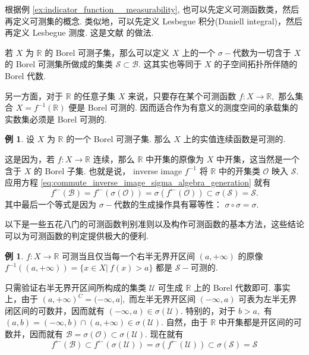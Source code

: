 \documentclass[12pt, a4paper, oneside]{book}
\numberwithin{figure}{section}
\theoremstyle{definition}
\newtheorem{example}[theorem]{例}
\begin{document}
根据例 \ref{ex:indicator_function__measurability}, 也可以先定义可测函数类，然后再定义可测集的概念. 类似地，可以先定义 Lesbegue 积分(Daniell integral)，然后再定义 Lesbegue 测度. 这是文献 \cite{Willem_2022} 的做法.

若 $X$ 为 $\mathbb R$ 的 Borel 可测子集，那么可以定义 $X$ 上的一个 $\sigma-$代数为一切含于 $X$ 的 Borel 可测集所做成的集类 $\mathcal S\subset \mathcal B.$ 这其实也等同于 $X$ 的子空间拓扑所伴随的 Borel 代数.

另一方面，对于 $\mathbb R$ 的任意子集 $X$ 来说，只要存在某个可测函数 $f:X\to\mathbb R,$ 那么集合 $X=f^{-1}(\mathbb R)$ 便是 Borel 可测的. 因而适合作为有意义的测度空间的承载集的实数集必须是 Borel 可测的.
\begin{example}
    设 $X$ 为 $\mathbb R$ 的一个 Borel 可测子集. 那么 $X$ 上的实值连续函数是可测的.
\end{example}
这是因为，若 $f:X\to\mathbb R$ 连续，那么 $\mathbb R$ 中开集的原像为 $X$ 中开集，这当然是一个含于 $X$ 的 Borel 子集.
也就是说， inverse image $f^{-1}$ 将 $\mathbb R$ 中的开集类 $\mathcal O$ 映入 $\mathcal S.$ 应用方程 \eqref{eq:commute_inverse_image_sigma_algebra_generation} 就有
\begin{equation}
    f^\leftarrow(\mathcal B)=f^\leftarrow(\sigma(\mathcal O))=\sigma(f^\leftarrow(\mathcal O))\subset \sigma(\mathcal S)=\mathcal S.
\end{equation}
其中最后一个等式是因为 $\sigma-$代数的生成操作具有幂等性： $\sigma\circ\sigma=\sigma.$

以下是一些五花八门的可测函数判别准则以及构作可测函数的基本方法，这些结论可以为可测函数的判定提供极大的便利.

\begin{example}\label{ex:function__measurability_semiinfinite_open_interval}
    $f:X\to\mathbb R$ 可测当且仅当每一个右半无界开区间 $(a,+\infty)$ 的原像 $f^{-1}((a,+\infty))=\{x\in X|\ f(x)>a\}$ 都是 $\mathcal S-$可测的. 
\end{example}
只需验证右半无界开区间所构成的集类 $\mathcal U$ 可生成 $\mathbb R$ 上的 Borel 代数即可. 事实上，由于 $(a,+\infty)^C=(-\infty,a],$ 而左半无界开区间 $(-\infty,a)$ 可表为左半无界闭区间的可数并，因而就有 $(-\infty,a)\in\sigma(\mathcal U).$ 特别的，对于 $b>a,$ 有 $(a,b)=(-\infty,b)\cap (a,+\infty)\in\sigma(\mathcal U).$ 自然，由于 $\mathbb R$ 中开集都是开区间的可数并，因而就有 
$\mathcal B=\sigma(\mathcal O)\subset\sigma(\mathcal U).$ 现在就有
\begin{equation}
    f^{\leftarrow}(\mathcal B)\subset f^{\leftarrow}(\sigma(\mathcal U))=\sigma(f^{\leftarrow}(\mathcal U))\subset\sigma(\mathcal S)=\mathcal S
\end{equation}
\end{document}
